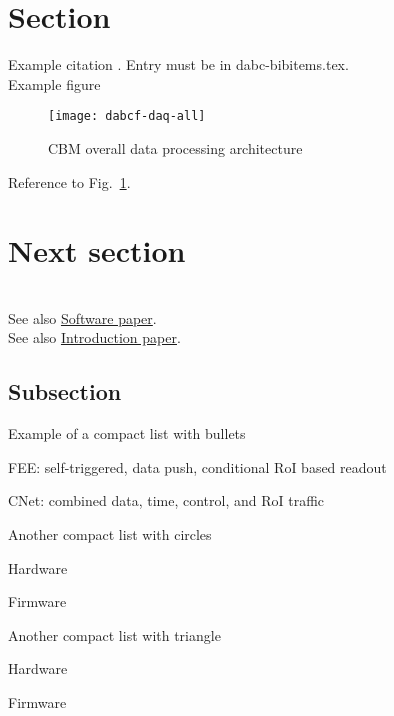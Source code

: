 \section{Section}

Example citation \cite{CBM-stat-rep}. Entry must be in
dabc-bibitems.tex.\\ %

Example figure
\begin{figure}[htb]
\centering\texttt{[image: dabcf-daq-all]} %
\caption{CBM overall data processing architecture}
\label{fig:XXX-fig} %
\end{figure}


Reference to Fig.~\ref{fig:XXX-fig}.
\clearpage %

\section{Next section}

\\
See also \hyperref{http://dabc.gsi.de/doc/manuals/main-software.pdf}{sw}{data}{Software paper}.\\
See also \hyperref{http://dabc.gsi.de/doc/manuals/main-intro.pdf}{in}{mission}{Introduction paper}.

\subsection{Subsection}

Example of a compact list with bullets
\bbul
\item FEE: self-triggered, data push, conditional RoI based readout
\item CNet: combined data, time, control, and RoI traffic
\ebul

Another compact list with circles
\bcir
\item Hardware
\item Firmware
\ecir

Another compact list with triangle
\btri
\item Hardware
\item Firmware
\etri

